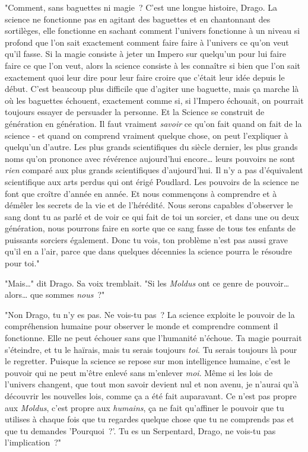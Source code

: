 "Comment, sans baguettes ni magie~? C'est une longue histoire, Drago. La science ne fonctionne pas en agitant des baguettes et en chantonnant des sortilèges, elle fonctionne en sachant comment l'univers fonctionne à un niveau si profond que l'on sait exactement comment faire faire à l'univers ce qu'on veut qu'il fasse. Si la magie consiste à jeter un Impero sur quelqu'un pour lui faire faire ce que l'on veut, alors la science consiste à les connaître si bien que l'on sait exactement quoi leur dire pour leur faire croire que c'était leur idée depuis le début. C'est beaucoup plus difficile que d'agiter une baguette, mais ça marche là où les baguettes échouent, exactement comme si, si l'Impero échouait, on pourrait toujours essayer de persuader la personne. Et la Science se construit de génération en génération. Il faut vraiment \emph{savoir} ce qu'on fait quand on fait de la science - et quand on comprend vraiment quelque chose, on peut l'expliquer à quelqu'un d'autre. Les plus grands scientifiques du siècle dernier, les plus grands noms qu'on prononce avec révérence aujourd'hui encore… leurs pouvoirs ne sont \emph{rien} comparé aux plus grands scientifiques d'aujourd'hui. Il n'y a pas d'équivalent scientifique aux arts perdus qui ont érigé Poudlard. Les pouvoirs de la science ne font que croître d'année en année. Et nous commençons à comprendre et à démêler les secrets de la vie et de l'hérédité. Nous serons capables d'observer le sang dont tu as parlé et de voir ce qui fait de toi un sorcier, et dans une ou deux génération, nous pourrons faire en sorte que ce sang fasse de tous tes enfants de puissants sorciers également. Donc tu vois, ton problème n'est pas aussi grave qu'il en a l'air, parce que dans quelques décennies la science pourra le résoudre pour toi."

"Mais…" dit Drago. Sa voix tremblait. "Si les \emph{Moldus} ont ce genre de pouvoir… alors… que sommes \emph{nous}~?"

"Non Drago, tu n'y es pas. Ne vois-tu pas~? La science exploite le pouvoir de la compréhension humaine pour observer le monde et comprendre comment il fonctionne. Elle ne peut échouer sans que l'humanité n'échoue. Ta magie pourrait s'éteindre, et tu le haïrais, mais tu serais toujours \emph{toi}. Tu serais toujours là pour le regretter. Puisque la science se repose sur mon intelligence humaine, c'est le pouvoir qui ne peut m'être enlevé sans m'enlever \emph{moi}. Même si les lois de l'univers changent, que tout mon savoir devient nul et non avenu, je n'aurai qu'à découvrir les nouvelles lois, comme ça a été fait auparavant. Ce n'est pas propre aux \emph{Moldus}, c'est propre aux \emph{humains}, ça ne fait qu'affiner le pouvoir que tu utilises à chaque fois que tu regardes quelque chose que tu ne comprends pas et que tu demandes 'Pourquoi~?'. Tu es un Serpentard, Drago, ne vois-tu pas l'implication~?"

